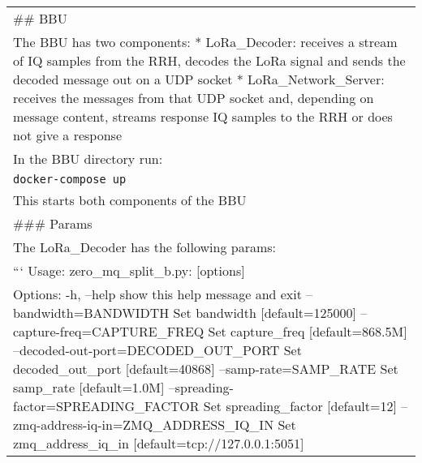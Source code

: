 \begin{longtable}[]{@{}l@{}}
\toprule
\begin{minipage}[t]{0.04\columnwidth}\raggedright\strut
\#\# BBU\strut
\end{minipage}\tabularnewline
\begin{minipage}[t]{0.04\columnwidth}\raggedright\strut
The BBU has two components: * LoRa\_Decoder: receives a stream of IQ
samples from the RRH, decodes the LoRa signal and sends the decoded
message out on a UDP socket * LoRa\_Network\_Server: receives the
messages from that UDP socket and, depending on message content, streams
response IQ samples to the RRH or does not give a response\strut
\end{minipage}\tabularnewline
\begin{minipage}[t]{0.04\columnwidth}\raggedright\strut
In the BBU directory run:\strut
\end{minipage}\tabularnewline
\begin{minipage}[t]{0.04\columnwidth}\raggedright\strut
\texttt{docker-compose\ up}\strut
\end{minipage}\tabularnewline
\begin{minipage}[t]{0.04\columnwidth}\raggedright\strut
This starts both components of the BBU\strut
\end{minipage}\tabularnewline
\begin{minipage}[t]{0.04\columnwidth}\raggedright\strut
\#\#\# Params\strut
\end{minipage}\tabularnewline
\begin{minipage}[t]{0.04\columnwidth}\raggedright\strut
The LoRa\_Decoder has the following params:\strut
\end{minipage}\tabularnewline
\begin{minipage}[t]{0.04\columnwidth}\raggedright\strut
``` Usage: zero\_mq\_split\_b.py: {[}options{]}\strut
\end{minipage}\tabularnewline
\begin{minipage}[t]{0.04\columnwidth}\raggedright\strut
Options: -h, --help show this help message and exit
--bandwidth=BANDWIDTH Set bandwidth {[}default=125000{]}
--capture-freq=CAPTURE\_FREQ Set capture\_freq {[}default=868.5M{]}
--decoded-out-port=DECODED\_OUT\_PORT Set decoded\_out\_port
{[}default=40868{]} --samp-rate=SAMP\_RATE Set samp\_rate
{[}default=1.0M{]} --spreading-factor=SPREADING\_FACTOR Set
spreading\_factor {[}default=12{]}
--zmq-address-iq-in=ZMQ\_ADDRESS\_IQ\_IN Set zmq\_address\_iq\_in
{[}default=tcp://127.0.0.1:5051{]}\strut
\end{minipage}\tabularnewline

\end{longtable}
